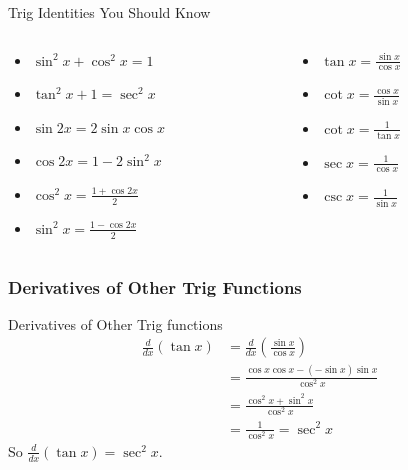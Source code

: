 \documentclass[cal1spr16Lectures.tex]{subfiles}
\begin{document}
\begin{frame}{\small Trig Identities You Should Know}
\begin{columns}[T]
\begin{column}{.5\textwidth}
\begin{itemize}\footnotesize
	\item $\sin^2 x + \cos^2 x = 1$ \vspace{0.2cm}
	\item $\tan^2 x + 1 = \sec^2 x$ \vspace{0.2cm}
	\item $\sin 2x =2\sin x \cos x$ \vspace{0.2cm}
	\item $\cos 2x = 1-2\sin^2 x$ \vspace{0.2cm}
	\item $\cos^2 x = \frac{1+\cos 2x}{2}$ \vspace{0.1cm}
	\item $\sin^2 x = \frac{1-\cos 2x}{2}$ \vspace{0.2cm}
\end{itemize}
\end{column}
\begin{column}{.5\textwidth}
\begin{itemize}\footnotesize
	\item $\tan x = \frac{\sin x}{\cos x}$ \vspace{0.2cm}
	\item $\cot x = \frac{\cos x}{\sin x}$ \vspace{0.2cm}
	\item $\cot x = \frac{1}{\tan x}$ \vspace{0.2cm}
	\item $\sec x = \frac{1}{\cos x}$ \vspace{0.1cm}
	\item $\csc x = \frac{1}{\sin x}$ \vspace{0.2cm}
\end{itemize}
\end{column}
\end{columns}
\end{frame}

\subsubsection{Derivatives of Other Trig Functions}

\begin{frame}{\small Derivatives of Other Trig functions}\footnotesize
\begin{align*}
\frac{d}{dx}(\tan x)&=\frac{d}{dx} \left( \frac{\sin x}{\cos x}\right) \\
 &= \frac{\cos x \cos x - (-\sin x)\sin x }{\cos^2 x} \\
&= \frac{\cos^2 x + \sin^2 x}{\cos^2 x} \\
&= \frac{1}{\cos^2 x} = \sec^2 x
\end{align*}
So \alert{$\frac{d}{dx} (\tan x)=\sec^2 x$}.
\end{frame}
\end{document}
